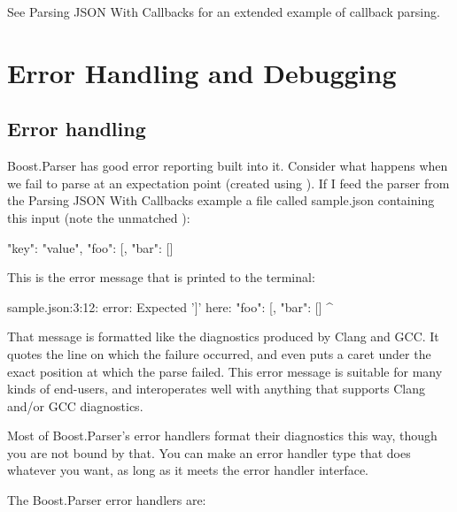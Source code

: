 \documentclass{MyBook}
\begin{document}
See Parsing JSON With Callbacks for an extended example of callback parsing.

\section{Error Handling and Debugging}

\subsection{Error handling}

Boost.Parser has good error reporting built into it. Consider what happens when we fail to parse at an expectation point (created using ). If I feed the parser from the Parsing JSON With Callbacks example a file called sample.json containing this input (note the unmatched \ci{'{}{[}'{}}):

\begin{code}
{
    "key": "value",
    "foo": [, "bar": []
}
\end{code}

This is the error message that is printed to the terminal:

\begin{code}
sample.json:3:12: error: Expected ']' here:
    "foo": [, "bar": []
            ^
\end{code}

That message is formatted like the diagnostics produced by Clang and GCC. It quotes the line on which the failure occurred, and even puts a caret under the exact position at which the parse failed. This error message is suitable for many kinds of end-users, and interoperates well with anything that supports Clang and/or GCC diagnostics.

Most of Boost.Parser's error handlers format their diagnostics this way, though you are not bound by that. You can make an error handler type that does whatever you want, as long as it meets the error handler interface.

The Boost.Parser error handlers are:
\end{document}
